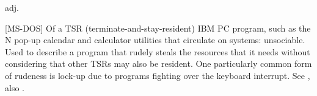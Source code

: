  adj.

[MS-DOS] Of a TSR (terminate-and-stay-resident) IBM PC program, such as the N pop-up calendar and calculator utilities that circulate on
 systems: unsociable. Used to describe a program that rudely steals the resources that it needs without considering that
other TSRs may also be resident. One particularly common form of rudeness is lock-up due to programs fighting over the keyboard interrupt.
See , also .

